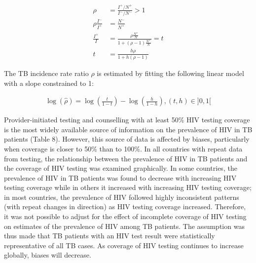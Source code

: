 \begin{equation*}
\begin{align*}
\rho &= \frac{I^+/N^+}{I^-/N^-} > 1    \\
\rho \frac{I^-}{I^+} &= \frac{N^-}{N^+}  \\
\frac{I^+}{I} &= \frac{\rho \frac{N^+}{N}}{1 + (\rho - 1)\frac{N^+}{N}} = t \\
t &= \frac{h \rho}{1 + h(\rho - 1)}
\end{align*}
\end{equation*}

The TB incidence rate ratio $\rho$ is estimated by fitting the following linear model with a slope constrained to 1:

\begin{align}
\log(\hat{\rho}) = \log \left(\frac{t}{1-t}\right) - \log \left(\frac{h}{1-h}\right), (t, h) \in ]0,1[
\label{eqn:irr}
\end{align}

Provider-initiated testing and counselling with at least 50\% HIV testing coverage is the most widely available source of information on the prevalence of HIV in TB patients (Table 8). However, this source of data is affected by biases, particularly when coverage is closer to 50\% than to 100\%. In all countries with repeat data from testing, the relationship between the prevalence of HIV in TB patients and the coverage of HIV testing was examined graphically. In some countries, the prevalence of HIV in TB patients was found to decrease with increasing HIV testing coverage while in others it increased with increasing HIV testing coverage; in most countries, the prevalence of HIV followed highly inconsistent patterns (with repeat changes in direction) as HIV testing coverage increased. Therefore, it was not possible to adjust for the effect of incomplete coverage of HIV testing on estimates of the prevalence of HIV among TB patients. The assumption was thus made that TB patients with an HIV test result were statistically representative of all TB cases. As coverage of HIV testing continues to increase globally, biases will decrease. 


